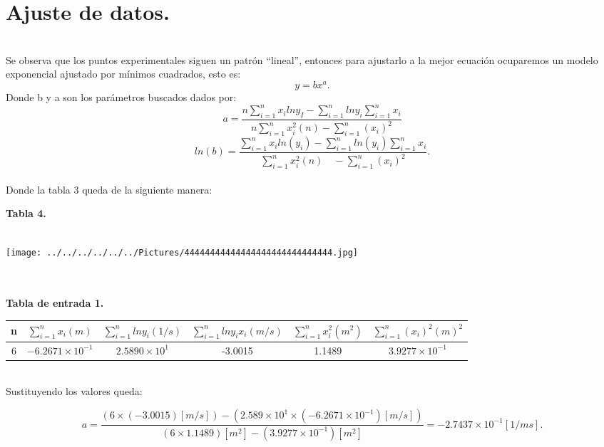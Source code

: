 \documentclass[10pt,a4paper]{article}
\begin{document}
\section*{Ajuste de datos.}\\

Se observa que los puntos experimentales siguen un patr\'{o}n “lineal”, entonces para ajustarlo a la mejor ecuaci\'{o}n ocuparemos un modelo exponencial ajustado por m\'{i}nimos cuadrados, esto es:
\[ y=b{ x }^{ a }.\]
Donde b y a son los par\'{a}metros buscados dados por:
\[a=\frac { n\sum _{ i=1 }^{ n }{ { x }_{ i }ln{ y }_{ I } } -\sum _{ i=1 }^{ n }{ ln{ y }_{ i } } \sum _{ i=1 }^{ n }{ { x }_{ i } }  }{ n\sum _{ i=1 }^{ n }{ { x }_{ i }^{ 2 } } (n)-\sum _{ i=1 }^{ n }{ { \left( { x }_{ i } \right)  }^{ 2 } }  } \]
\[ln(b)=\frac { \sum _{ i=1 }^{ n }{ { x }_{ i }ln({ y }_{ i })- } \sum _{ i=1 }^{ n }{ ln({ y }_{ i })\sum _{ i=1 }^{ n }{ { x }_{ i } }  }  }{ \sum _{ i=1 }^{ n }{ { x }_{ i }^{ 2 }(n)\quad -\sum _{ i=1 }^{ n }{ { \left( { x }_{ i } \right)  }^{ 2 } }  }  } . \]
\\
Donde la tabla 3 queda de la siguiente manera:
\\
\medskip
\begin{figure 2}
\caption{\textbf{Tabla 4.}}
\\
\centering
\texttt{[image: ../../../../../../Pictures/44444444444444444444444444444.jpg]} 
\\
\end{figure 2}
\\
\medskip
\medskip
\\
\textbf{Tabla de entrada 1.}
\\
\begin{figure 6}
\centering
\begin{tabular}{|c|c|c|c|c|c|}
\hline 
n&$\sum _{ i=1 }^{ n }{ { x }_{ i } } (m)$ & $\sum _{ i=1 }^{ n }{ { ln y }_{ i } }(1/s)$ & $ \sum _{ i=1 }^{ n }{ {ln y }_{ i } } { x }_{ i }(m/s)$ & $\sum _{ i=1 }^{ n }{ { x }_{ i }^{ 2 } }({ m }^{ 2 })$& $\sum _{ i=1 }^{ n }{ { \left( { x }_{ i } \right)  }^{ 2 }{ (m) }^{ 2 } }$ \\ 
\hline 
6&$ -6.2671\times { 10 }^{ -1 } $& $2.5890\times { 10 }^{ 1 }$ & -3.0015 & 1.1489 & $3.9277\times { 10 }^{ -1 }$ \\ 
\hline 
\end{tabular}
\end{figure 6} 
\\
Sustituyendo los valores queda:

\[ a=\frac { (6\times (-3.0015)\left[ { m }/{ s } \right] )-(2.589\times { 10 }^{ 1 }\times (-6.2671\times { 10 }^{ -1 })\left[ { m }/{ s } \right] ) }{ (6\times 1.1489)\left[ { m }^{ 2 } \right] -(3.9277\times { 10 }^{ -1 })\left[ { m }^{ 2 } \right]  } =-2.7437\times { 10 }^{ -1 }\left[ { 1 }/{ ms } \right] .\]
\end{document}
